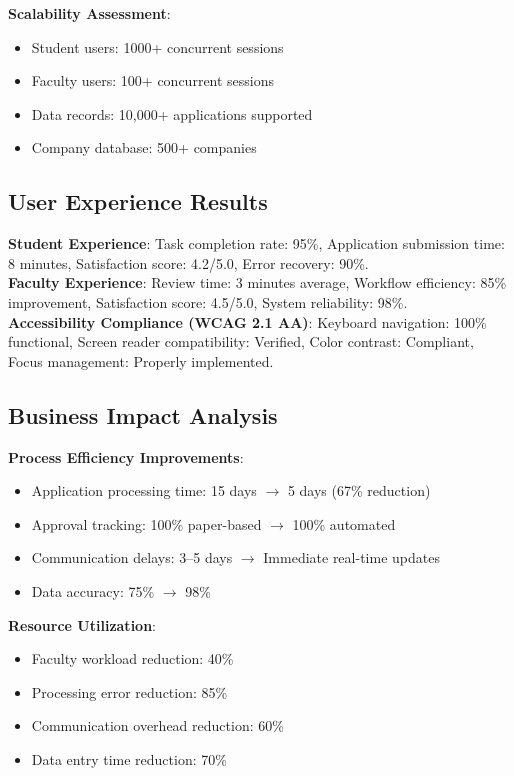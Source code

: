 \documentclass[conference]{IEEEtran}
\begin{document}
\textbf{Scalability Assessment}:
\begin{itemize}
  \item Student users: 1000+ concurrent sessions
  \item Faculty users: 100+ concurrent sessions
  \item Data records: 10,000+ applications supported
  \item Company database: 500+ companies
\end{itemize}

\subsection{User Experience Results}
\textbf{Student Experience}: Task completion rate: 95\%, Application submission time: 8 minutes, Satisfaction score: 4.2/5.0, Error recovery: 90\%.\\
\textbf{Faculty Experience}: Review time: 3 minutes average, Workflow efficiency: 85\% improvement, Satisfaction score: 4.5/5.0, System reliability: 98\%.\\
\textbf{Accessibility Compliance (WCAG 2.1 AA)}: Keyboard navigation: 100\% functional, Screen reader compatibility: Verified, Color contrast: Compliant, Focus management: Properly implemented.

\subsection{Business Impact Analysis}
\textbf{Process Efficiency Improvements}:
\begin{itemize}
  \item Application processing time: 15 days $\rightarrow$ 5 days (67\% reduction)
  \item Approval tracking: 100\% paper-based $\rightarrow$ 100\% automated
  \item Communication delays: 3--5 days $\rightarrow$ Immediate real-time updates
  \item Data accuracy: 75\% $\rightarrow$ 98\%
\end{itemize}

\textbf{Resource Utilization}:
\begin{itemize}
  \item Faculty workload reduction: 40\%
  \item Processing error reduction: 85\%
  \item Communication overhead reduction: 60\%
  \item Data entry time reduction: 70\%
\end{itemize}
\end{document}

